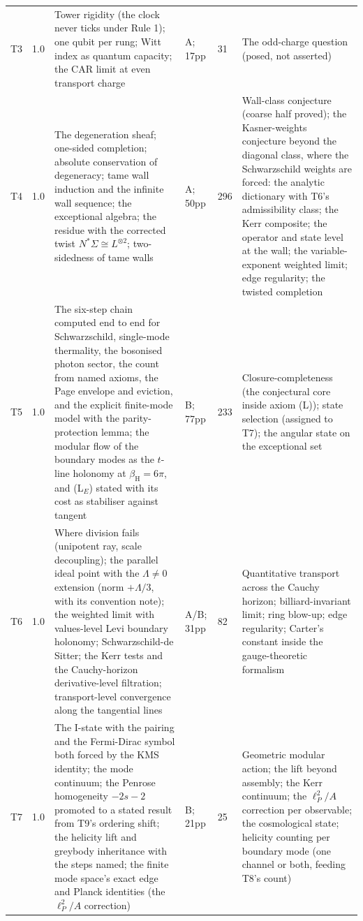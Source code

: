 \documentclass[11pt]{article}
\theoremstyle{definition}
\begin{document}
\begin{longtable}{p{} p{} p{} p{} p{} p{}}
T3 & 1.0 & Tower rigidity (the clock never ticks under Rule 1); one qubit per rung; Witt index as quantum capacity; the CAR limit at even transport charge \cite{ButlerT3} & A; 17pp & 31 & The odd-charge question (posed, not asserted) \\
T4 & 1.0 & The degeneration sheaf; one-sided completion; absolute conservation of degeneracy; tame wall induction and the infinite wall sequence; the exceptional algebra; the residue with the corrected twist $N^{*}\Sigma \cong L^{\otimes 2}$; two-sidedness of tame walls \cite{ButlerT4} & A; 50pp & 296 & Wall-class conjecture (coarse half proved); the Kasner-weights conjecture beyond the diagonal class, where the Schwarzschild weights are forced: the analytic dictionary with T6's admissibility class; the Kerr composite; the operator and state level at the wall; the variable-exponent weighted limit; edge regularity; the twisted completion \\
T5 & 1.0 & The six-step chain computed end to end for Schwarzschild, single-mode thermality, the bosonised photon sector, the count from named axioms, the Page envelope and eviction, and the explicit finite-mode model with the parity-protection lemma; the modular flow of the boundary modes as the $t$-line holonomy at $\beta_{\mathrm{H}} = 6\pi$, and (L$_E$) stated with its cost as stabiliser against tangent \cite{ButlerT5} & B; 77pp & 233 & Closure-completeness (the conjectural core inside axiom (L)); state selection (assigned to T7); the angular state on the exceptional set \\
T6 & 1.0 & Where division fails (unipotent ray, scale decoupling); the parallel ideal point with the $\Lambda \neq 0$ extension (norm $+\Lambda/3$, with its convention note); the weighted limit with values-level Levi boundary holonomy; Schwarzschild-de Sitter; the Kerr tests and the Cauchy-horizon derivative-level filtration; transport-level convergence along the tangential lines \cite{ButlerT6} & A/B; 31pp & 82 & Quantitative transport across the Cauchy horizon; billiard-invariant limit; ring blow-up; edge regularity; Carter's constant inside the gauge-theoretic formalism \\
T7 & 1.0 & The I-state with the pairing and the Fermi-Dirac symbol both forced by the KMS identity; the mode continuum; the Penrose homogeneity $-2s-2$ promoted to a stated result from T9's ordering shift; the helicity lift and greybody inheritance with the steps named; the finite mode space's exact edge and Planck identities (the $\ell_{P}^{2}/A$ correction) \cite{ButlerT7} & B; 21pp & 25 & Geometric modular action; the lift beyond assembly; the Kerr continuum; the $\ell_{P}^{2}/A$ correction per observable; the cosmological state; helicity counting per boundary mode (one channel or both, feeding T8's count) \\

\end{longtable}
\end{document}
